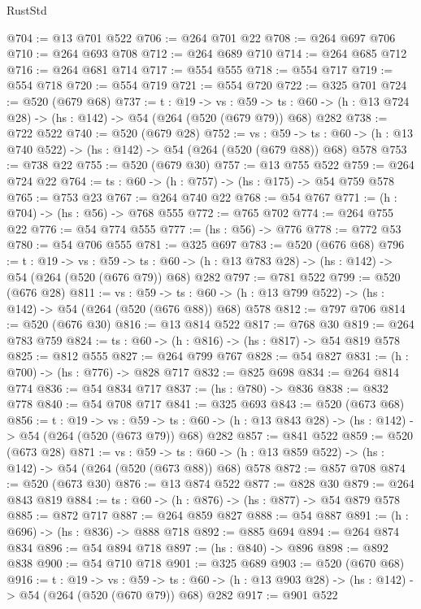 \begin{lexlean}{RustStd}
\begin{coremodule}
@704 := @13 @701 @522
@706 := @264 @701 @22
@708 := @264 @697 @706
@710 := @264 @693 @708
@712 := @264 @689 @710
@714 := @264 @685 @712
@716 := @264 @681 @714
@717 := @554 @555
@718 := @554 @717
@719 := @554 @718
@720 := @554 @719
@721 := @554 @720
@722 := @325 @701
@724 := @520 (@679 @68)
@737 := {t : @19} ->
  {vs : @59} ->
  {ts : @60} -> (h : @13 @724 @28) -> (hs : @142) -> @54 (@264 (@520 (@679 @79)) @68) @282
@738 := @722 @522
@740 := @520 (@679 @28)
@752 := {vs : @59} ->
  {ts : @60} -> (h : @13 @740 @522) -> (hs : @142) -> @54 (@264 (@520 (@679 @88)) @68) @578
@753 := @738 @22
@755 := @520 (@679 @30)
@757 := @13 @755 @522
@759 := @264 @724 @22
@764 := {ts : @60} -> (h : @757) -> (hs : @175) -> @54 @759 @578
@765 := @753 @23
@767 := @264 @740 @22
@768 := @54 @767
@771 := (h : @704) -> (hs : @56) -> @768 @555
@772 := @765 @702
@774 := @264 @755 @22
@776 := @54 @774 @555
@777 := (hs : @56) -> @776
@778 := @772 @53
@780 := @54 @706 @555
@781 := @325 @697
@783 := @520 (@676 @68)
@796 := {t : @19} ->
  {vs : @59} ->
  {ts : @60} -> (h : @13 @783 @28) -> (hs : @142) -> @54 (@264 (@520 (@676 @79)) @68) @282
@797 := @781 @522
@799 := @520 (@676 @28)
@811 := {vs : @59} ->
  {ts : @60} -> (h : @13 @799 @522) -> (hs : @142) -> @54 (@264 (@520 (@676 @88)) @68) @578
@812 := @797 @706
@814 := @520 (@676 @30)
@816 := @13 @814 @522
@817 := @768 @30
@819 := @264 @783 @759
@824 := {ts : @60} -> (h : @816) -> (hs : @817) -> @54 @819 @578
@825 := @812 @555
@827 := @264 @799 @767
@828 := @54 @827
@831 := (h : @700) -> (hs : @776) -> @828 @717
@832 := @825 @698
@834 := @264 @814 @774
@836 := @54 @834 @717
@837 := (hs : @780) -> @836
@838 := @832 @778
@840 := @54 @708 @717
@841 := @325 @693
@843 := @520 (@673 @68)
@856 := {t : @19} ->
  {vs : @59} ->
  {ts : @60} -> (h : @13 @843 @28) -> (hs : @142) -> @54 (@264 (@520 (@673 @79)) @68) @282
@857 := @841 @522
@859 := @520 (@673 @28)
@871 := {vs : @59} ->
  {ts : @60} -> (h : @13 @859 @522) -> (hs : @142) -> @54 (@264 (@520 (@673 @88)) @68) @578
@872 := @857 @708
@874 := @520 (@673 @30)
@876 := @13 @874 @522
@877 := @828 @30
@879 := @264 @843 @819
@884 := {ts : @60} -> (h : @876) -> (hs : @877) -> @54 @879 @578
@885 := @872 @717
@887 := @264 @859 @827
@888 := @54 @887
@891 := (h : @696) -> (hs : @836) -> @888 @718
@892 := @885 @694
@894 := @264 @874 @834
@896 := @54 @894 @718
@897 := (hs : @840) -> @896
@898 := @892 @838
@900 := @54 @710 @718
@901 := @325 @689
@903 := @520 (@670 @68)
@916 := {t : @19} ->
  {vs : @59} ->
  {ts : @60} -> (h : @13 @903 @28) -> (hs : @142) -> @54 (@264 (@520 (@670 @79)) @68) @282
@917 := @901 @522

\end{coremodule}
\end{lexlean}
